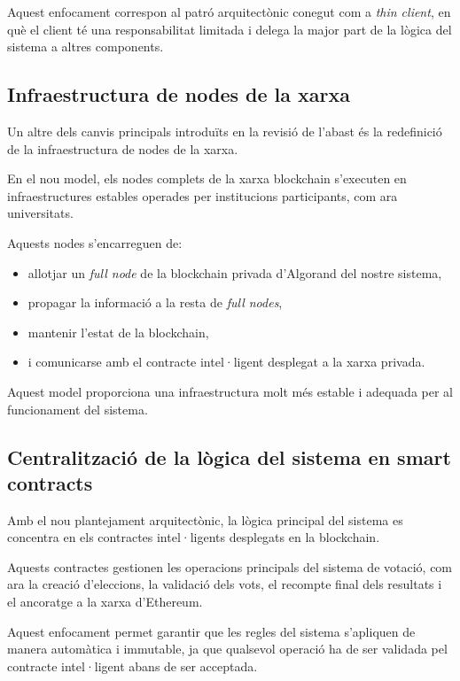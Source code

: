 \documentclass[12pt,a4paper]{article}
\begin{document}
Aquest enfocament correspon al patró arquitectònic conegut com a \textit{thin client}, en què el client té una responsabilitat limitada i delega la major part de la lògica del sistema a altres components.

\subsection{Infraestructura de nodes de la xarxa}

Un altre dels canvis principals introduïts en la revisió de l'abast és la redefinició de la infraestructura de nodes de la xarxa.

En el nou model, els nodes complets de la xarxa blockchain s'executen en infraestructures estables operades per institucions participants, com ara universitats.

Aquests nodes s'encarreguen de:

\begin{itemize}
\item allotjar un \textit{full node} de la blockchain privada d'Algorand del nostre sistema,
\item propagar la informació a la resta de \textit{full nodes},
\item mantenir l'estat de la blockchain,
\item i comunicarse amb el contracte intel·ligent desplegat a la xarxa privada.
\end{itemize}

Aquest model proporciona una infraestructura molt més estable i adequada per al funcionament del sistema.

\subsection{Centralització de la lògica del sistema en smart contracts}

Amb el nou plantejament arquitectònic, la lògica principal del sistema es concentra en els contractes intel·ligents desplegats en la blockchain.

Aquests contractes gestionen les operacions principals del sistema de votació, com ara la creació d'eleccions, la validació dels vots, el recompte final dels resultats i el ancoratge a la xarxa d'Ethereum.

Aquest enfocament permet garantir que les regles del sistema s'apliquen de manera automàtica i immutable, ja que qualsevol operació ha de ser validada pel contracte intel·ligent abans de ser acceptada.
\end{document}
